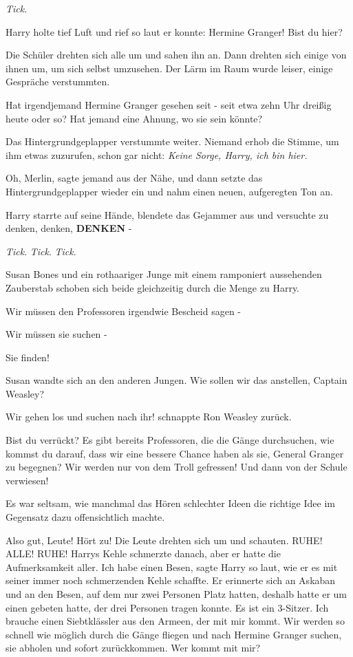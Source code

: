 \emph{Tick}.

Harry holte tief Luft und rief so laut er konnte: \glqq Hermine Granger! Bist du
hier?\grqq{}

Die Schüler drehten sich alle um und sahen ihn an. Dann drehten sich einige von
ihnen um, um sich selbst umzusehen. Der Lärm im Raum wurde leiser, einige
Gespräche verstummten.

\glqq Hat irgendjemand Hermine Granger gesehen seit - seit etwa zehn Uhr dreißig
heute oder so? Hat jemand eine Ahnung, wo sie sein könnte?\grqq{}

Das Hintergrundgeplapper verstummte weiter. Niemand erhob die Stimme, um ihm
etwas zuzurufen, schon gar nicht: \glqq \emph{Keine Sorge, Harry, ich bin hier.}

\glqq Oh, Merlin\grqq{}, sagte jemand aus der Nähe, und dann setzte das
Hintergrundgeplapper wieder ein und nahm einen neuen, aufgeregten Ton an.

Harry starrte auf seine Hände, blendete das Gejammer aus und versuchte zu
denken, denken, \textbf{DENKEN} -

\emph{Tick}. \emph{Tick}. \emph{Tick}.

Susan Bones und ein rothaariger Junge mit einem ramponiert aussehenden
Zauberstab schoben sich beide gleichzeitig durch die Menge zu Harry.

\glqq Wir müssen den Professoren irgendwie Bescheid sagen -\grqq{}

\glqq Wir müssen sie suchen -\grqq{}

\glqq Sie finden!\grqq{}

Susan wandte sich an den anderen Jungen. \glqq Wie sollen wir das anstellen,
Captain Weasley?\grqq{}

\glqq Wir gehen los und suchen nach ihr!\grqq{} schnappte Ron Weasley zurück.

\glqq Bist du verrückt? Es gibt bereits Professoren, die die Gänge durchsuchen,
wie kommst du darauf, dass wir eine bessere Chance haben als sie, General
Granger zu begegnen? Wir werden nur von dem Troll gefressen! Und dann von der
Schule verwiesen!\grqq{}

Es war seltsam, wie manchmal das Hören schlechter Ideen die richtige Idee im
Gegensatz dazu offensichtlich machte.

\glqq Also gut, Leute! Hört zu!\grqq{} Die Leute drehten sich um und schauten.
\glqq RUHE! ALLE! RUHE!\grqq{} Harrys Kehle schmerzte danach, aber er hatte die
Aufmerksamkeit aller. \glqq Ich habe einen Besen\grqq{}, sagte Harry so laut,
wie er es mit seiner immer noch schmerzenden Kehle schaffte. Er erinnerte sich
an Askaban und an den Besen, auf dem nur zwei Personen Platz hatten, deshalb
hatte er um einen gebeten hatte, der drei Personen tragen konnte. \glqq Es ist
ein 3-Sitzer. Ich brauche einen Siebtklässler aus den Armeen, der mit mir kommt.
Wir werden so schnell wie möglich durch die Gänge fliegen und nach Hermine
Granger suchen, sie abholen und sofort zurückkommen. Wer kommt mit mir?\grqq{}

